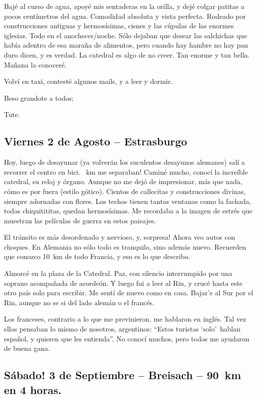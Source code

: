 Baj\'e al curso de agua, apoy\'e mis sentaderas en la orilla, y dej\'e colgar
patitas a pocos cent\'imetros del agua. Comodidad absoluta y vista perfecta.
Rodeado por construcciones antiguas y hermos\'isimas, cisnes y las c\'upulas
de las enormes iglesias. Todo en el anochecer/noche. S\'olo dejaban que desear
las salchichas que hab\'ia adentro de esa mara\~na de alimentos, pero cuando
hay hambre no hay pan duro dicen, y es verdad. La catedral es algo de no
creer. Tan enorme y tan bella. Ma\~nana la conocer\'e.

Volv\'i en taxi, contest\'e algunos mails, y a leer y dormir.

Beso grandote a todos;

Tute.

\subsection*{Viernes 2 de Agosto -- Estrasburgo}

Hoy, luego de desayunar (ya volver\'an los suculentos desayunos alemanes)
sal\'i a recorrer el centro en bici. ~km me separaban!
Camin\'e mucho, conoc\'i la incre\'ible catedral, su reloj y \'organo. Aunque no
me dej\'o de impresionar, m\'as que nada, c\'omo es por fuera (estilo g\'otico).
Cientos de callecitas y construcciones divinas, siempre adornadas con flores.
Los techos tienen tantas ventanas como la fachada, todas chiquitititas, quedan
hermos\'isimas. Me recordaba a la imagen de estr\'es que muestran las
pel\'iculas de guerra en estos paisajes.

El tr\'ansito es m\'as desordenado y nervioso, y, \textexclamdown sorpresa!
Ahora veo autos con choques. En Alemania no s\'olo todo es tranquilo, sino
adem\'as nuevo. Recuerden que conozco 10~km de todo Francia, y eso es lo que
describo.

Almorc\'e en la plaza de la Catedral. Paz, con silencio interrumpido por una
soprano acompa\~nada de acorde\'on. Y luego fui a leer al Rin, y cruc\'e
hasta este otro pa\'is solo para escribir. Me sent\'i de nuevo como en casa.
Bajar'e al Sur por el Rin, aunque no se si del lado alem\'an o el franc\'es.

Los franceses, contrario a lo que me previnieron, me hablaron en ingl\'es. Tal
vez ellos pensaban lo mismo de nosotros, argentinos: ``Estos turistas `solo'\
hablan espa\~nol, y quieren que les entienda''. No conoc\'i muchos, pero todos
me ayudaron de buena gana.

\subsection*{S\'abado! 3 de Septiembre -- Breisach -- 90~km en 4 horas.}

